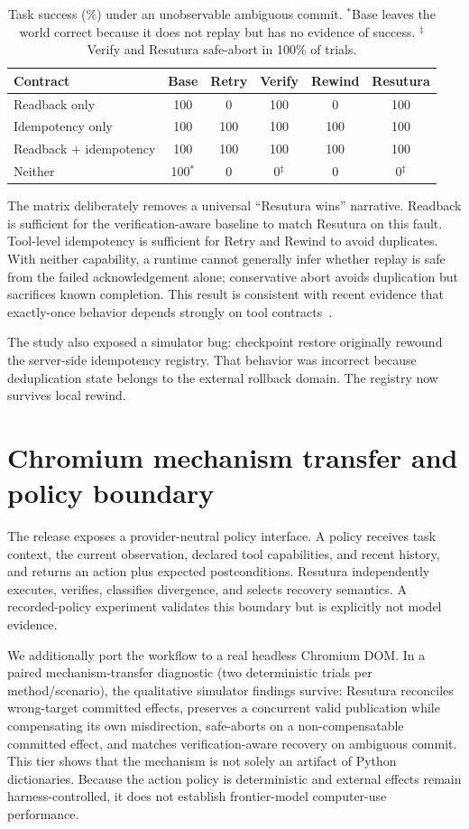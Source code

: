 \documentclass{article}
\begin{document}
\begin{table}[t]
\centering
\small
\begin{tabular}{lccccc}
\toprule
Contract & Base & Retry & Verify & Rewind & Resutura \\
\midrule
Readback only & 100 & 0 & 100 & 0 & 100 \\
Idempotency only & 100 & 100 & 100 & 100 & 100 \\
Readback + idempotency & 100 & 100 & 100 & 100 & 100 \\
Neither & 100$^*$ & 0 & 0$^{\ddagger}$ & 0 & 0$^{\ddagger}$ \\
\bottomrule
\end{tabular}
\caption{Task success (\%) under an unobservable ambiguous commit. $^*$Base leaves the world correct because it does not replay but has no evidence of success. $^{\ddagger}$Verify and Resutura safe-abort in 100\% of trials.}
\label{tab:contracts}
\end{table}

The matrix deliberately removes a universal ``Resutura wins'' narrative. Readback is sufficient for the verification-aware baseline to match Resutura on this fault. Tool-level idempotency is sufficient for Retry and Rewind to avoid duplicates. With neither capability, a runtime cannot generally infer whether replay is safe from the failed acknowledgement alone; conservative abort avoids duplication but sacrifices known completion. This result is consistent with recent evidence that exactly-once behavior depends strongly on tool contracts~\cite{verified,limbo}.

The study also exposed a simulator bug: checkpoint restore originally rewound the server-side idempotency registry. That behavior was incorrect because deduplication state belongs to the external rollback domain. The registry now survives local rewind.

\section{Chromium mechanism transfer and policy boundary}
The release exposes a provider-neutral policy interface. A policy receives task context, the current observation, declared tool capabilities, and recent history, and returns an action plus expected postconditions. Resutura independently executes, verifies, classifies divergence, and selects recovery semantics. A recorded-policy experiment validates this boundary but is explicitly not model evidence.

We additionally port the workflow to a real headless Chromium DOM. In a paired mechanism-transfer diagnostic (two deterministic trials per method/scenario), the qualitative simulator findings survive: Resutura reconciles wrong-target committed effects, preserves a concurrent valid publication while compensating its own misdirection, safe-aborts on a non-compensatable committed effect, and matches verification-aware recovery on ambiguous commit. This tier shows that the mechanism is not solely an artifact of Python dictionaries. Because the action policy is deterministic and external effects remain harness-controlled, it does not establish frontier-model computer-use performance.
\end{document}
